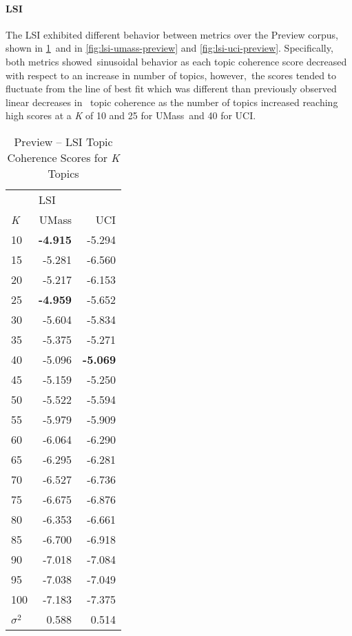 \documentclass[letterpaper,12pt]{article}
\begin{document}
\newpage
\paragraph{LSI}
The LSI exhibited different behavior between metrics over the Preview corpus, shown in \ref{tab:lsi_preview_tc}\
and in \ref{fig:lsi-umass-preview} and \ref{fig:lsi-uci-preview}. Specifically, both metrics showed\
sinusoidal behavior as each topic coherence score decreased with respect to an increase in number of topics, however,\
the scores tended to fluctuate from the line of best fit which was different than previously observed linear decreases in \
topic coherence as the number of topics increased reaching high scores at a \emph{K} of 10 and 25 for UMass\
and 40 for UCI. 

\begin{table}
	\caption{\label{tab:lsi_preview_tc} Preview -- LSI Topic Coherence Scores for \emph{K} Topics}
	\begin{center}
		\begin{tabular}{lrr}
			\toprule
			{} & \multicolumn{2}{l}{LSI} \\
			\emph{K} &  UMass &    UCI \\
			\midrule
			10  & \textbf{-4.915} & -5.294 \\
			15  & -5.281 & -6.560 \\
			20  & -5.217 & -6.153 \\
			25  & \textbf{-4.959} & -5.652 \\
			30  & -5.604 & -5.834 \\
			35  & -5.375 & -5.271 \\
			40  & -5.096 & \textbf{-5.069} \\
			45  & -5.159 & -5.250 \\
			50  & -5.522 & -5.594 \\
			55  & -5.979 & -5.909 \\
			60  & -6.064 & -6.290 \\
			65  & -6.295 & -6.281 \\
			70  & -6.527 & -6.736 \\
			75  & -6.675 & -6.876 \\
			80  & -6.353 & -6.661 \\
			85  & -6.700 & -6.918 \\
			90  & -7.018 & -7.084 \\
			95  & -7.038 & -7.049 \\
			100 & -7.183 & -7.375 \\
			\midrule
			$\sigma^2$ & 0.588 & 0.514 \\
			\bottomrule
			\end{tabular}
	\end{center}
\end{table}
\end{document}
